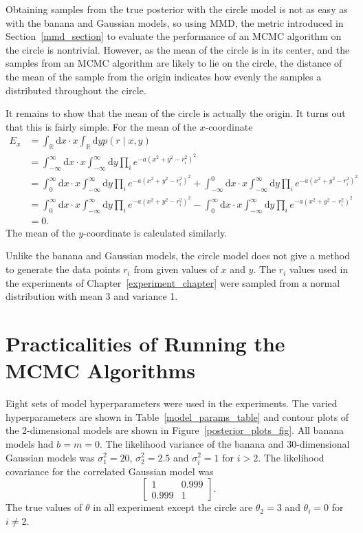 \documentclass[english,twoside,openright]{HYgraduMLDS}
\newcommand{\R}{\mathbb{R}}
\newcommand{\dx}{\mathrm{d}}
\begin{document}
Obtaining samples from the true posterior with the circle model is not
as easy as with the banana and Gaussian models, so using MMD, the metric
introduced in Section~\ref{mmd_section} to evaluate
the performance of an MCMC algorithm on the circle is nontrivial. However,
as the mean of the circle is in its center, and the samples from an MCMC
algorithm are likely to lie on the circle, the distance of the mean of the
sample from the origin indicates how evenly the samples a distributed throughout
the circle.

It remains to show that the mean of the circle is actually the origin. It turns
out that this is fairly simple. For the mean of the \(x\)-coordinate
\begin{align*}
  E_{x} &= \int_{\R}\dx x\cdot x\int_{\R} \dx y p(r\mid x, y)
  \\&= \int_{-\infty}^{\infty}\dx x\cdot x\int_{-\infty}^{\infty}\dx y
  \prod_{i} e^{-a(x^{2} + y^{2} - r_{i}^{2})^{2}}
  \\&= \int_{0}^{\infty}\dx x\cdot x\int_{-\infty}^{\infty}\dx y
  \prod_{i} e^{-a(x^{2} + y^{2} - r_{i}^{2})^{2}}
  + \int_{-\infty}^{0}\dx x\cdot x\int_{-\infty}^{\infty}\dx y
  \prod_{i} e^{-a(x^{2} + y^{2} - r_{i}^{2})^{2}}
  \\&= \int_{0}^{\infty}\dx x\cdot x\int_{-\infty}^{\infty}\dx y
  \prod_{i} e^{-a(x^{2} + y^{2} - r_{i}^{2})^{2}}
  - \int_{0}^{\infty}\dx x\cdot x\int_{-\infty}^{\infty}\dx y
  \prod_{i} e^{-a(x^{2} + y^{2} - r_{i}^{2})^{2}}
  \\&= 0.
\end{align*}
The mean of the \(y\)-coordinate is calculated similarly.

Unlike the banana and Gaussian models,
the circle model does not give a method to generate the data points
\(r_{i}\) from given values of \(x\) and \(y\). The \(r_{i}\) values used
in the experiments of Chapter~\ref{experiment_chapter} were sampled
from a normal distribution with mean 3 and variance 1.

\section{Practicalities of Running the MCMC Algorithms}\label{practical_section}

Eight sets of model hyperparameters were used in the experiments.
The varied hyperparameters are shown in
Table~\ref{model_params_table} and contour plots of the
2-dimensional models are shown in Figure~\ref{posterior_plots_fig}.
All banana models had \(b = m = 0\). The likelihood variance of the banana
and 30-dimensional Gaussian
models was \(\sigma_{1}^{2} = 20\), \(\sigma_{2}^{2} = 2.5\) and
\(\sigma_{i}^{2} = 1\)
for \(i > 2\). The likelihood covariance for the correlated Gaussian model
was
\[
\begin{bmatrix}
  1 & 0.999 \\
  0.999 & 1
\end{bmatrix}.
\]
The true values of \(\theta\) in all experiment except the circle are
\(\theta_{2} = 3\) and \(\theta_{i} = 0\) for \(i \neq 2\).
\end{document}
